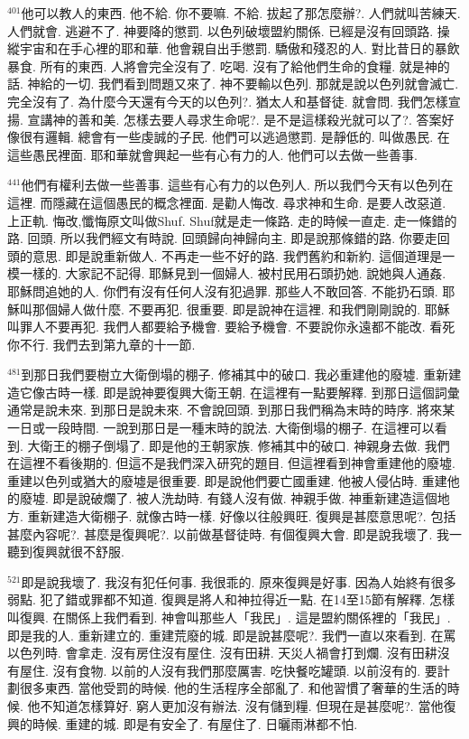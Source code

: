 \documentclass{book}
\begin{document}
$^{401}$他可以教人的東西.
他不給.
你不要嘛.
不給.
拔起了那怎麼辦?.
人們就叫苦練天.
人們就會.
逃避不了.
神要降的懲罰.
以色列破壞盟約關係.
已經是沒有回頭路.
操縱宇宙和在手心裡的耶和華.
他會親自出手懲罰.
驕傲和殘忍的人.
對比昔日的暴飲暴食.
所有的東西.
人將會完全沒有了.
吃喝.
沒有了給他們生命的食糧.
就是神的話.
神給的一切.
我們看到問題又來了.
神不要輸以色列.
那就是說以色列就會滅亡.
完全沒有了.
為什麼今天還有今天的以色列?.
猶太人和基督徒.
就會問.
我們怎樣宣揚.
宣講神的善和美.
怎樣去要人尋求生命呢?.
是不是這樣殺光就可以了?.
答案好像很有邏輯.
總會有一些虔誠的子民.
他們可以逃過懲罰.
是靜低的.
叫做愚民.
在這些愚民裡面.
耶和華就會興起一些有心有力的人.
他們可以去做一些善事.

$^{441}$他們有權利去做一些善事.
這些有心有力的以色列人.
所以我們今天有以色列在這裡.
而隱藏在這個愚民的概念裡面.
是勸人悔改.
尋求神和生命.
是要人改惡道.
上正軌.
悔改,懺悔原文叫做Shuf.
Shuf就是走一條路.
走的時候一直走.
走一條錯的路.
回頭.
所以我們經文有時說.
回頭歸向神歸向主.
即是說那條錯的路.
你要走回頭的意思.
即是說重新做人.
不再走一些不好的路.
我們舊約和新約.
這個道理是一模一樣的.
大家記不記得.
耶穌見到一個婦人.
被村民用石頭扔她.
說她與人通姦.
耶穌問追她的人.
你們有沒有任何人沒有犯過罪.
那些人不敢回答.
不能扔石頭.
耶穌叫那個婦人做什麼.
不要再犯.
很重要.
即是說神在這裡.
和我們剛剛說的.
耶穌叫罪人不要再犯.
我們人都要給予機會.
要給予機會.
不要說你永遠都不能改.
看死你不行.
我們去到第九章的十一節.

$^{481}$到那日我們要樹立大衛倒塌的棚子.
修補其中的破口.
我必重建他的廢墟.
重新建造它像古時一樣.
即是說神要復興大衛王朝.
在這裡有一點要解釋.
到那日這個詞彙通常是說未來.
到那日是說未來.
不會說回頭.
到那日我們稱為末時的時序.
將來某一日或一段時間.
一說到那日是一種末時的說法.
大衛倒塌的棚子.
在這裡可以看到.
大衛王的棚子倒塌了.
即是他的王朝家族.
修補其中的破口.
神親身去做.
我們在這裡不看後期的.
但這不是我們深入研究的題目.
但這裡看到神會重建他的廢墟.
重建以色列或猶大的廢墟是很重要.
即是說他們要亡國重建.
他被人侵佔時.
重建他的廢墟.
即是說破爛了.
被人洗劫時.
有錢人沒有做.
神親手做.
神重新建造這個地方.
重新建造大衛棚子.
就像古時一樣.
好像以往般興旺.
復興是甚麼意思呢?.
包括甚麼內容呢?.
甚麼是復興呢?.
以前做基督徒時.
有個復興大會.
即是說我壞了.
我一聽到復興就很不舒服.

$^{521}$即是說我壞了.
我沒有犯任何事.
我很乖的.
原來復興是好事.
因為人始終有很多弱點.
犯了錯或罪都不知道.
復興是將人和神拉得近一點.
在14至15節有解釋.
怎樣叫復興.
在關係上我們看到.
神會叫那些人「我民」.
這是盟約關係裡的「我民」.
即是我的人.
重新建立的.
重建荒廢的城.
即是說甚麼呢?.
我們一直以來看到.
在罵以色列時.
會拿走.
沒有房住沒有屋住.
沒有田耕.
天災人禍會打到爛.
沒有田耕沒有屋住.
沒有食物.
以前的人沒有我們那麼厲害.
吃快餐吃罐頭.
以前沒有的.
要計劃很多東西.
當他受罰的時候.
他的生活程序全部亂了.
和他習慣了奢華的生活的時候.
他不知道怎樣算好.
窮人更加沒有辦法.
沒有儲到糧.
但現在是甚麼呢?.
當他復興的時候.
重建的城.
即是有安全了.
有屋住了.
日曬雨淋都不怕.
\end{document}
